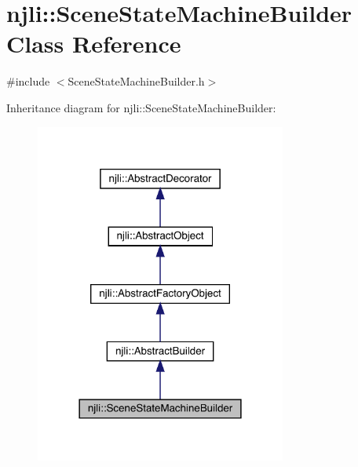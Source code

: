 \hypertarget{classnjli_1_1_scene_state_machine_builder}{}\section{njli\+:\+:Scene\+State\+Machine\+Builder Class Reference}
\label{classnjli_1_1_scene_state_machine_builder}


{\ttfamily \#include $<$Scene\+State\+Machine\+Builder.\+h$>$}



Inheritance diagram for njli\+:\+:Scene\+State\+Machine\+Builder\+:\nopagebreak
\begin{figure}[H]
\begin{center}
\leavevmode
\includegraphics[width=234pt]{classnjli_1_1_scene_state_machine_builder__inherit__graph}
\end{center}
\end{figure}


